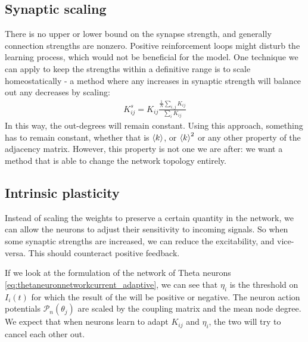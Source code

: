 \subsection{Synaptic scaling}
There is no upper or lower bound on the synapse strength, and generally connection strengths are nonzero. Positive reinforcement loops might disturb the learning process, which would not be beneficial for the model. One technique we can apply to keep the strengths within a definitive range is to scale homeostatically - a method where any increases in synaptic strength will balance out any decreases by scaling:
\begin{align}
K_{ij}^s = K_{ij} \frac{\frac{1}{N} \sum_{i,j} K_{ij}}{\sum_{i} K_{ij}}
\end{align}
In this way, the out-degrees will remain constant. Using this approach, something has to remain constant, whether that is ${\langle k\rangle}$, or ${\langle k\rangle}^2$ or any other property of the adjacency matrix. However, this property is not one we are after: we want a method that is able to change the network topology entirely.


\subsection{Intrinsic plasticity}
Instead of scaling the weights to preserve a certain quantity in the network, we can allow the neurons to adjust their sensitivity to incoming signals. So when some synaptic strengths are increased, we can reduce the excitability, and vice-versa. This should counteract positive feedback. 

If we look at the formulation of the network of Theta neurons \eqref{eq:thetaneuronnetworkcurrent_adaptive}, we can see that $\eta_i$ is the threshold on $I_i(t)$ for which the result of the \PRC will be positive or negative. The neuron action potentials $\mathcal{P}_n(\theta_j)$ are scaled by the coupling matrix and the mean node degree. We expect that when neurons learn to adapt $K_{ij}$ and $\eta_i$, the two will try to cancel each other out.

